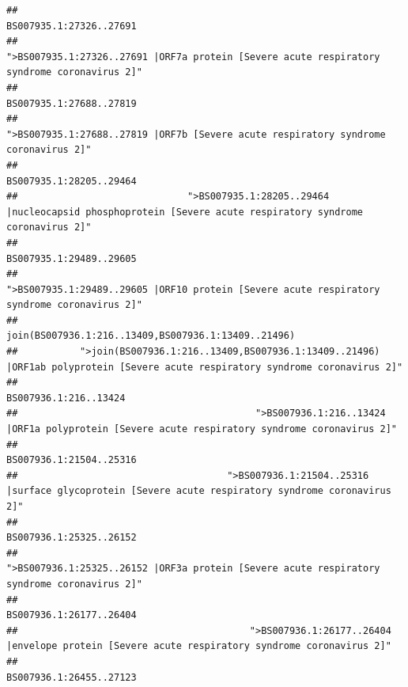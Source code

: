 \documentclass[
]{article}
\begin{document}
\begin{verbatim}
##                                                                                                                BS007935.1:27326..27691 
##                                            ">BS007935.1:27326..27691 |ORF7a protein [Severe acute respiratory syndrome coronavirus 2]" 
##                                                                                                                BS007935.1:27688..27819 
##                                                    ">BS007935.1:27688..27819 |ORF7b [Severe acute respiratory syndrome coronavirus 2]" 
##                                                                                                                BS007935.1:28205..29464 
##                              ">BS007935.1:28205..29464 |nucleocapsid phosphoprotein [Severe acute respiratory syndrome coronavirus 2]" 
##                                                                                                                BS007935.1:29489..29605 
##                                            ">BS007935.1:29489..29605 |ORF10 protein [Severe acute respiratory syndrome coronavirus 2]" 
##                                                                                    join(BS007936.1:216..13409,BS007936.1:13409..21496) 
##           ">join(BS007936.1:216..13409,BS007936.1:13409..21496) |ORF1ab polyprotein [Severe acute respiratory syndrome coronavirus 2]" 
##                                                                                                                  BS007936.1:216..13424 
##                                          ">BS007936.1:216..13424 |ORF1a polyprotein [Severe acute respiratory syndrome coronavirus 2]" 
##                                                                                                                BS007936.1:21504..25316 
##                                     ">BS007936.1:21504..25316 |surface glycoprotein [Severe acute respiratory syndrome coronavirus 2]" 
##                                                                                                                BS007936.1:25325..26152 
##                                            ">BS007936.1:25325..26152 |ORF3a protein [Severe acute respiratory syndrome coronavirus 2]" 
##                                                                                                                BS007936.1:26177..26404 
##                                         ">BS007936.1:26177..26404 |envelope protein [Severe acute respiratory syndrome coronavirus 2]" 
##                                                                                                                BS007936.1:26455..27123 

\end{verbatim}
\end{document}
